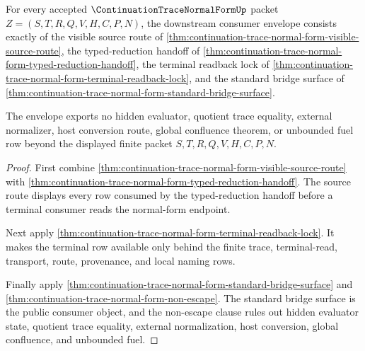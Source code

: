 \begin{theorem}
\label{thm:continuation-trace-normal-form-consumer-readback-envelope}
For every accepted $\ContinuationTraceNormalFormUp$ packet $Z=(S,T,R,Q,V,H,C,P,N)$, the downstream consumer envelope consists exactly of the visible source route of \autoref{thm:continuation-trace-normal-form-visible-source-route}, the typed-reduction handoff of \autoref{thm:continuation-trace-normal-form-typed-reduction-handoff}, the terminal readback lock of \autoref{thm:continuation-trace-normal-form-terminal-readback-lock}, and the standard bridge surface of \autoref{thm:continuation-trace-normal-form-standard-bridge-surface}.

The envelope exports no hidden evaluator, quotient trace equality, external normalizer, host conversion route, global confluence theorem, or unbounded fuel row beyond the displayed finite packet $S,T,R,Q,V,H,C,P,N$.
\end{theorem}
\begin{proof}
First combine \autoref{thm:continuation-trace-normal-form-visible-source-route} with \autoref{thm:continuation-trace-normal-form-typed-reduction-handoff}. The source route displays every row consumed by the typed-reduction handoff before a terminal consumer reads the normal-form endpoint.

Next apply \autoref{thm:continuation-trace-normal-form-terminal-readback-lock}. It makes the terminal row available only behind the finite trace, terminal-read, transport, route, provenance, and local naming rows.

Finally apply \autoref{thm:continuation-trace-normal-form-standard-bridge-surface} and \autoref{thm:continuation-trace-normal-form-non-escape}. The standard bridge surface is the public consumer object, and the non-escape clause rules out hidden evaluator state, quotient trace equality, external normalization, host conversion, global confluence, and unbounded fuel.
\end{proof}

